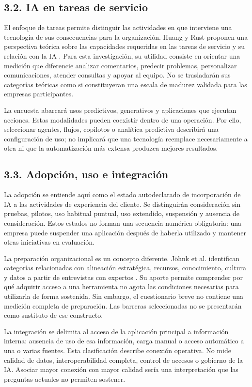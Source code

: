 \documentclass[12pt,letterpaper]{article}
\begin{document}
\subsection*{3.2. IA en tareas de servicio}
El enfoque de tareas permite distinguir las actividades en que interviene una tecnología de sus consecuencias para la organización. Huang y Rust proponen una perspectiva teórica sobre las capacidades requeridas en las tareas de servicio y su relación con la IA \citep{huang}. Para esta investigación, su utilidad consiste en orientar una medición que diferencie analizar comentarios, predecir problemas, personalizar comunicaciones, atender consultas y apoyar al equipo. No se trasladarán sus categorías teóricas como si constituyeran una escala de madurez validada para las empresas participantes.

La encuesta abarcará usos predictivos, generativos y aplicaciones que ejecutan acciones. Estas modalidades pueden coexistir dentro de una operación. Por ello, seleccionar agentes, flujos, copilotos o analítica predictiva describirá una configuración de uso; no implicará que una tecnología reemplace necesariamente a otra ni que la automatización más extensa produzca mejores resultados.

\subsection*{3.3. Adopción, uso e integración}
La adopción se entiende aquí como el estado autodeclarado de incorporación de IA a las actividades de experiencia del cliente. Se distinguirán consideración sin pruebas, pilotos, uso habitual puntual, uso extendido, suspensión y ausencia de consideración. Estos estados no forman una secuencia numérica obligatoria: una empresa puede suspender una aplicación después de haberla utilizado y mantener otras iniciativas en evaluación.

La preparación organizacional es un concepto diferente. Jöhnk et al. identifican categorías relacionadas con alineación estratégica, recursos, conocimiento, cultura y datos a partir de entrevistas con expertos \citep{johnk}. Su aporte permite comprender por qué adquirir acceso a una herramienta no agota las condiciones necesarias para utilizarla de forma sostenida. Sin embargo, el cuestionario breve no contiene una medición completa de preparación. Las barreras seleccionadas no se presentarán como sustituto de ese constructo.

La integración se delimita al acceso de la aplicación principal a información interna: ausencia de uso de esa información, carga manual o acceso automático a una o varias fuentes. Esta clasificación describe conexión operativa. No mide calidad de datos, interoperabilidad completa, control de accesos o gobierno de la IA. Asociar mayor conexión con mayor calidad sería una interpretación que las preguntas actuales no permiten sostener.
\end{document}
